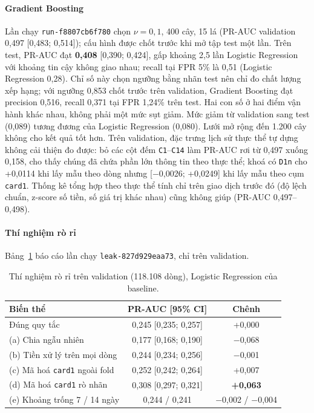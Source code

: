 \documentclass[11pt,a4paper]{article}
\theoremstyle{definition}
\theoremstyle{remark}
\newcommand{\code}[1]{\texttt{#1}}
\numberwithin{equation}{section}
\begin{document}
\paragraph{Gradient Boosting} Lần chạy \code{run-f8807cb6f780} chọn $\nu=0{,}1$, 400 cây, 15 lá (PR-AUC validation 0,497 [0,483; 0,514]); cấu hình được chốt trước khi mở tập test một lần. Trên test, PR-AUC đạt \textbf{0,408} [0,390; 0,424], gấp khoảng 2,5 lần Logistic Regression với khoảng tin cậy không giao nhau; recall tại FPR 5\% là 0,51 (Logistic Regression 0,28). Chỉ số này chọn ngưỡng bằng nhãn test nên chỉ đo chất lượng xếp hạng; với ngưỡng 0,853 chốt trước trên validation, Gradient Boosting đạt precision 0,516, recall 0,371 tại FPR 1,24\% trên test. Hai con số ở hai điểm vận hành khác nhau, không phải một mức sụt giảm. Mức giảm từ validation sang test (0,089) tương đương của Logistic Regression (0,080). Lưới mở rộng đến 1.200 cây không cho kết quả tốt hơn. Trên validation, đặc trưng lịch sử thực thể tự dựng không cải thiện đo được: bỏ các cột đếm \code{C1}--\code{C14} làm PR-AUC rơi từ 0,497 xuống 0,158, cho thấy chúng đã chứa phần lớn thông tin theo thực thể; khoá có \code{D1n} cho +0,0114 khi lấy mẫu theo dòng nhưng [$-$0,0026; +0,0249] khi lấy mẫu theo cụm \code{card1}. Thống kê tổng hợp theo thực thể tính chỉ trên giao dịch trước đó (độ lệch chuẩn, z-score số tiền, số giá trị khác nhau) cũng không giúp (PR-AUC 0,497--0,498).

\paragraph{Thí nghiệm rò rỉ} Bảng~\ref{tab:leak} báo cáo lần chạy \code{leak-827d929eaa73}, chỉ trên validation.

\begin{table}[H]\centering
\caption{Thí nghiệm rò rỉ trên validation (118.108 dòng), Logistic Regression của baseline.}\label{tab:leak}
\begin{tabular}{@{}lcc@{}}
\toprule
Biến thể & PR-AUC [95\% CI] & Chênh \\ \midrule
Đúng quy tắc & 0,245 [0,235; 0,257] & +0,000 \\
(a) Chia ngẫu nhiên & 0,177 [0,168; 0,190] & $-$0,068 \\
(b) Tiền xử lý trên mọi dòng & 0,244 [0,234; 0,256] & $-$0,001 \\
(c) Mã hoá \code{card1} ngoài fold & 0,252 [0,242; 0,264] & +0,007 \\
(d) Mã hoá \code{card1} rò nhãn & 0,308 [0,297; 0,321] & \textbf{+0,063} \\
(e) Khoảng trống 7 / 14 ngày & 0,244 / 0,241 & $-$0,002 / $-$0,004 \\ \bottomrule
\end{tabular}
\end{table}
\end{document}
